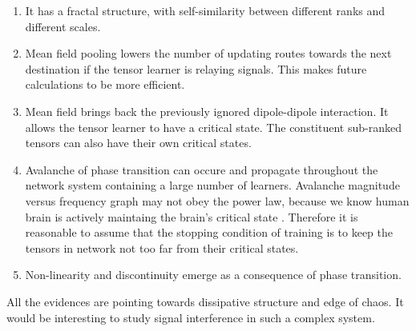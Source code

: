 \documentclass[11pt,a4paper]{article}
\begin{document}
\begin{multicols}{2}
  \begin{enumerate}
    \item It has a fractal structure, with self-similarity between different ranks and different scales.
    \item Mean field pooling lowers the number of updating routes towards the next destination if the tensor learner is relaying signals. This makes future calculations to be more efficient. 
    \item Mean field brings back the previously ignored dipole-dipole interaction. It allows the tensor learner to have a critical state. The constituent sub-ranked tensors can also have their own critical states. 
    \item Avalanche of phase transition can occure and propagate throughout the network system containing a large number of learners. Avalanche magnitude versus frequency graph may not obey the power law, because we know human brain is actively maintaing the brain's critical state \cite{brochini2016phase}. Therefore it is reasonable to assume that the stopping condition of training is to keep the tensors in network not too far from their critical states. 
    \item Non-linearity and discontinuity emerge as a consequence of phase transition. 
    \end{enumerate}
  
  All the evidences are pointing towards dissipative structure and edge of chaos. It would be interesting to study signal interference in such a complex system.
\end{multicols}



\end{document}
